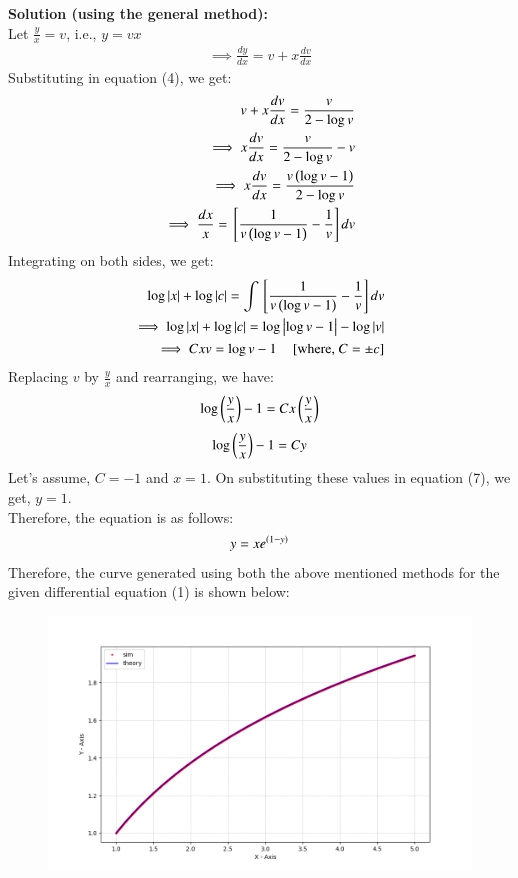 \documentclass[journal]{IEEEtran}
\begin{document}
\begin{enumerate}
\textbf{Solution (using the general method):}\\
Let $\frac{y}{x} = v$, i.e., $y = vx$
\begin{align*}
    \implies \frac{dy}{dx} = v + x \frac{dv}{dx}
\end{align*}
Substituting in equation (4), we get:
\begin{align*}
    v + x \frac{dv}{dx} = \frac{v}{2 - \log{v}}\\
    \implies x \frac{dv}{dx} = \frac{v}{2 - \log{v}} - v\\
    \implies x \frac{dv}{dx} = \frac{v \left(\log{v} - 1\right)}{2 - \log{v}}\\
    \implies \frac{dx}{x} = {}\left[\frac{1}{v \left(\log{v} - 1\right)} - \frac{1}{v}\right] dv
\end{align*}
Integrating on both sides, we get:
\begin{align*}
    \log{\left\vert x\right\vert} + \log{\left\vert c\right\vert} = \int {}\left[\frac{1}{v \left(\log{v} - 1\right)} - \frac{1}{v}\right] dv\\
    \implies \log{\left\vert x\right\vert} + \log{\left\vert c\right\vert} = \log{\left\vert\log{v} - 1\right\vert} - \log{\left\vert v\right\vert}\\
    \implies C x v = \log{v} - 1 \quad {}\left[\text{where, }C = \pm c\right] 
\end{align*}
Replacing $v$ by $\frac{y}{x}$ and rearranging, we have:
\begin{align*}
    \log{\ensuremath{\left(\frac{y}{x}\right)}} - 1 = C x \left(\frac{y}{x}\right)
\end{align*}
\begin{align}
    \log{\ensuremath{\left(\frac{y}{x}\right)}} - 1 = C y 
\end{align}
Let's assume, $C=-1$ and $x = 1$. On substituting these values in equation (7), we get, $y = 1$.\\
Therefore, the equation is as follows:
\begin{align*}
    y = x e^{\left(1-y\right)}
\end{align*}
Therefore, the curve generated using both the above mentioned methods for the given differential equation (1) is shown below:
\begin{figure}[H]
    \centering
    \includegraphics[width = \columnwidth]{figs/fig.png}
\end{figure}
\end{enumerate}
\end{document}
